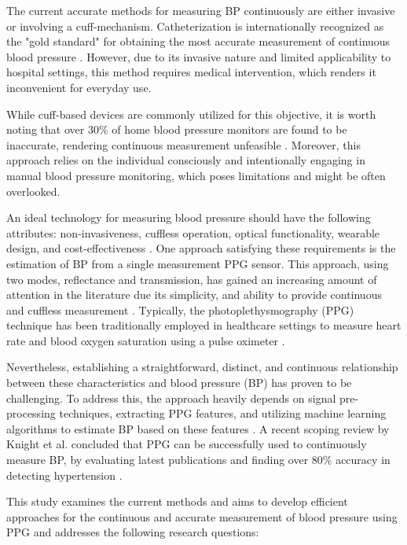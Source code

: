 \documentclass[10pt, bibliography=totoc]{scrartcl}
\begin{document}
The current accurate methods for measuring BP continuously are either invasive or involving a cuff-mechanism.
Catheterization is internationally recognized as the "gold standard" for obtaining the most accurate measurement of continuous blood pressure \cite{sharmaCuffLessContinuousBlood2017}.
However, due to its invasive nature and limited applicability to hospital settings, this method requires medical intervention, which renders it inconvenient for everyday use.

While cuff-based devices are commonly utilized for this objective, it is worth noting that over 30\% of home blood pressure monitors are found to be inaccurate, rendering continuous measurement unfeasible \cite{leungHypertensionCanada20162016}. Moreover, this approach relies on the individual consciously and intentionally engaging in manual blood pressure monitoring, which poses limitations and might be often overlooked.

An ideal technology for measuring blood pressure should have the following attributes: non-invasiveness, cuffless operation, optical functionality, wearable design, and cost-effectiveness \cite{el-hajjDeepLearningModels2021}.
One approach satisfying these requirements is the estimation of BP from a single measurement PPG sensor.
This approach, using two modes, reflectance and transmission, has gained an increasing amount of attention in the literature due its simplicity, and ability to provide continuous and cuffless measurement \cite{el-hajjDeepLearningModels2021}.
Typically, the photoplethysmography (PPG) technique has been traditionally employed in healthcare settings to measure heart rate \cite{reyesWirelessPhotoplethysmographicDevice2012} and blood oxygen saturation using a pulse oximeter \cite{yoonMultipleDiagnosisBased2002}.

Nevertheless, establishing a straightforward, distinct, and continuous relationship between these characteristics and blood pressure (BP) has proven to be challenging.
To address this, the approach heavily depends on signal pre-processing techniques, extracting PPG features, and utilizing machine learning algorithms to estimate BP based on these features \cite{el-hajjDeepLearningModels2021}.
A recent scoping review by Knight et al. concluded that PPG can be successfully used to continuously measure BP, by evaluating latest publications and finding over 80\% accuracy in detecting hypertension \cite{knightAccuracyWearablePhotoplethysmography2022}.

This study examines the current methods and aims to develop efficient approaches for the continuous and accurate measurement of blood pressure using PPG and addresses the following research questions: 
\end{document}
